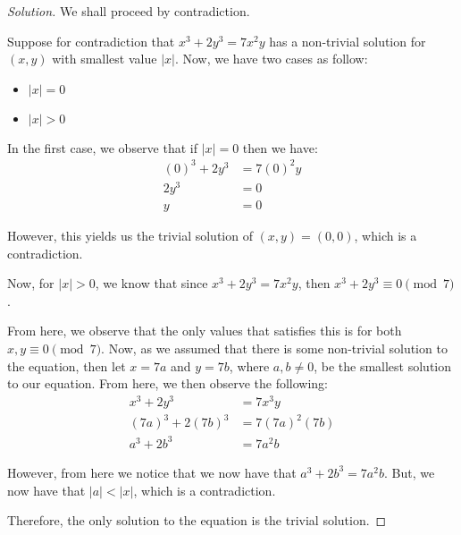 \documentclass{article}
\newenvironment{solution}{\begin{proof}[Solution]}{\end{proof}}
\begin{document}
\begin{solution}
	We shall proceed by contradiction.
	
	Suppose for contradiction that $x^{3} + 2y^{3} = 7x^{2}y$ has a non-trivial solution for $(x,y)$ with smallest value $\lvert x \rvert$. Now, we have two cases as follow:
	\begin{itemize}
		\item $\lvert x \rvert = 0$
		\item $\lvert x \rvert > 0$
	\end{itemize}

	In the first case, we observe that if $\lvert x \rvert = 0$ then we have:
	\begin{align*}
		(0)^{3} + 2y^{3} &= 7(0)^{2}y \\
		2y^{3} &= 0 \\
		y &= 0
	\end{align*}

	However, this yields us the trivial solution of $(x,y) = (0,0)$, which is a contradiction.
	
	Now, for $\lvert x \rvert > 0$, we know that since $x^{3} + 2y^{3} = 7x^{2}y$, then $x^{3} + 2y^{3} \equiv 0 \pmod 7$.
	
	From here, we observe that the only values that satisfies this is for both $x,y \equiv 0 \pmod 7$. Now, as we assumed that there is some non-trivial solution to the equation, then let $x = 7a$ and $y = 7b$, where $a,b \not= 0$, be the smallest solution to our equation. From here, we then observe the following:
	\begin{align*}
		x^{3} + 2y^{3} &= 7x^{3}y \\
		(7a)^{3} + 2(7b)^{3} &= 7(7a)^{2}(7b) \\
		a^{3} + 2b^{3} &= 7a^{2}b
	\end{align*}

	However, from here we notice that we now have that $a^{3} + 2b^{3} = 7a^{2}b$. But, we now have that $\lvert a \rvert < \lvert x \rvert$, which is a contradiction.
	
	Therefore, the only solution to the equation is the trivial solution.
\end{solution}

\newpage
\end{document}
